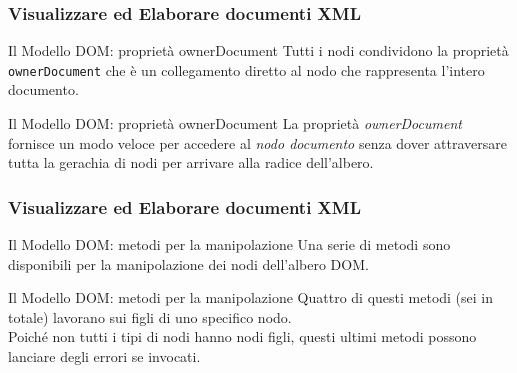 \begin{frame}
    \frametitle{Visualizzare ed Elaborare documenti XML}
    \addtocounter{nframe}{1}
    

     \begin{block}{Il Modello DOM: proprietà ownerDocument}
        Tutti i nodi condividono la proprietà \texttt{ownerDocument} che è un collegamento diretto al nodo che rappresenta l'intero documento.
     \end{block}

     \begin{block}{Il Modello DOM: proprietà ownerDocument}
        La proprietà \textit{ownerDocument} fornisce un modo veloce per accedere al \textit{nodo documento} senza dover attraversare tutta la gerachia di nodi per arrivare alla radice dell'albero.
     \end{block}

\end{frame}

\begin{frame}
    \frametitle{Visualizzare ed Elaborare documenti XML}
    \addtocounter{nframe}{1}
    

     \begin{block}{Il Modello DOM: metodi per la manipolazione}
        Una serie di metodi sono disponibili per la manipolazione dei nodi dell'albero DOM.
     \end{block}

     \begin{block}{Il Modello DOM: metodi per la manipolazione}
        Quattro di questi metodi (sei in totale) lavorano sui figli di uno specifico nodo.
        \\Poiché non tutti i tipi di nodi hanno nodi figli, questi ultimi metodi possono lanciare degli errori se invocati.
     \end{block}

\end{frame}

